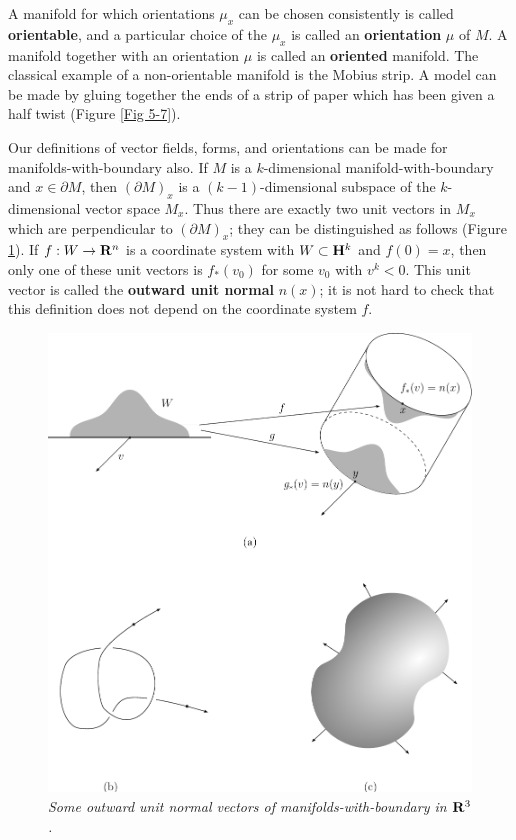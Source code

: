 A manifold for which orientations $\mu_x$ can be chosen consistently is called \textbf{orientable}, 
and a particular choice of the $\mu_x$ is called an \textbf{orientation} $\mu$ of $M$.
A manifold together with an orientation $\mu$ is called an \textbf{oriented} manifold.
The classical example of a non-orientable manifold is the Mobius strip.
A model can be made by gluing together the ends of a strip of
paper which has been given a half twist (Figure \ref{Fig 5-7}).

Our definitions of vector fields, forms, and orientations can be made for 
manifolds-with-boundary also. If $M$ is a $k$-dimensional manifold-with-boundary 
and $x\in \partial M$, then $(\partial M)_x$ is a $(k-1)$-dimensional subspace of the 
$k$-dimensional vector space $M_x$. Thus there are exactly two unit vectors in $M_x$
which are perpendicular to $(\partial M)_x$; they can be distinguished as follows 
(Figure \ref{Fig 5-8}). If $f: W\to \mathbf{R}^n$ is a coordinate system with $W\subset \mathbf{H}^k$ and 
$f(0) = x$, then only one of these unit vectors is $f_*(v_0)$ for some $v_0$ with $v^k < 0$.
This unit vector is called the \textbf{outward unit normal} $n(x)$; it is not hard to check that this
definition does not depend on the coordinate system $f$.

\begin{figure}[!htb]
    \centering
    \includegraphics[width=.75\linewidth]{./pics/Fig5-8.pdf}
    \caption{\textit{Some outward unit normal vectors of manifolds-with-boundary in $\mathbf{R}^3$.}}
    \label{Fig 5-8}
\end{figure}

